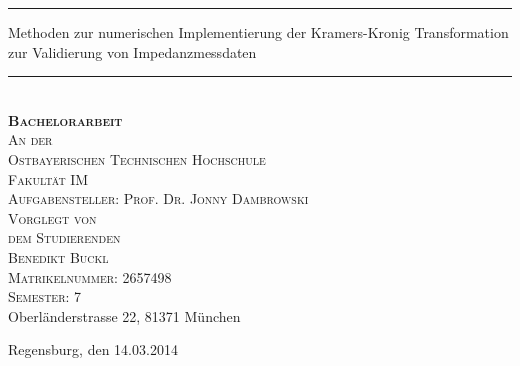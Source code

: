 
\begin{titlepage}


\vspace{4cm}
	\begin{figure}[h]
	\end{figure}
\begin{center}
\vspace*{0.3cm}
\noindent\rule{\textwidth}{1pt}
\huge{Methoden zur numerischen Implementierung der Kramers-Kronig Transformation zur Validierung von Impedanzmessdaten}
\noindent\rule{\textwidth}{1pt}
\\
\vspace*{1.3cm}
\Large{
\textbf{\textsc{Bachelorarbeit\\}}
}
\large{
\vspace*{0.5cm}
\textsc{An der\\}
\vspace*{0.5cm}
\textsc{Ostbayerischen Technischen Hochschule\\ Fakult\"at IM\\}
\vspace*{1.7cm}
\textsc{Aufgabensteller: Prof. Dr. Jonny Dambrowski\\}
\vspace*{0.4cm}
\textsc{Vorglegt von\\ dem Studierenden\\
	 \vspace*{0.5cm}
	 Benedikt Buckl\\
	 Matrikelnummer: 2657498\\
Semester: 7\\}
Oberl\"anderstrasse 22, 81371 M\"unchen\\
}

\vspace*{2.6cm}
Regensburg, den 14.03.2014 

\end{center}


\end{titlepage}


